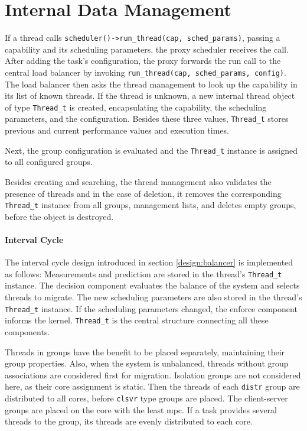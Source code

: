 \section{Internal Data Management}
\label{impl:internal}

If a thread calls \texttt{scheduler()->run\_thread(cap, sched\_params)}, passing
a capability and its scheduling parameters, the proxy scheduler
receives the call.
After adding the task's configuration, the proxy forwards the run call to the
central load balancer by invoking \texttt{run\_thread(cap, sched\_params, config)}.
The load balancer then asks the thread management to look up the capability in
its list of known threads.
If the thread is unknown, a new internal thread object of type
\texttt{Thread\_t} is created, encapsulating the capability, the scheduling
parameters, and the configuration.
Besides these three values, \texttt{Thread\_t} stores previous and current
performance values and execution times.

Next, the group configuration is evaluated and the \texttt{Thread\_t} instance
is assigned to all configured groups.

Besides creating and searching, the thread management also validates the
presence of threads and in the case of deletion, it removes the corresponding
\texttt{Thread\_t} instance from all groups, management lists, and deletes empty
groups, before the object is destroyed.


\paragraph{Interval Cycle}
The interval cycle design introduced in section \ref{design:balancer} is
implemented as follows:
Measurements and prediction are stored in the thread's \texttt{Thread\_t}
instance.
The decision component evaluates the balance of the system and selects threads
to migrate.
The new scheduling parameters are also stored in the thread's \texttt{Thread\_t}
instance.
If the scheduling parameters changed, the enforce component informs the kernel.
\texttt{Thread\_t} is the central structure connecting all these components.

Threads in groups have the benefit to be placed separately, maintaining their
group properties.
Also, when the system is unbalanced, threads without group associations are
considered first for migration.
Isolation groups are not considered here, as their core assignment is static.
Then the threads of each \texttt{distr} group are distributed to all cores, before
\texttt{clsvr} type groups are placed.
The client-server groups are placed on the core with the least \gls{mpc}.
If a task provides several threads to the group, its threads are evenly
distributed to each core.


